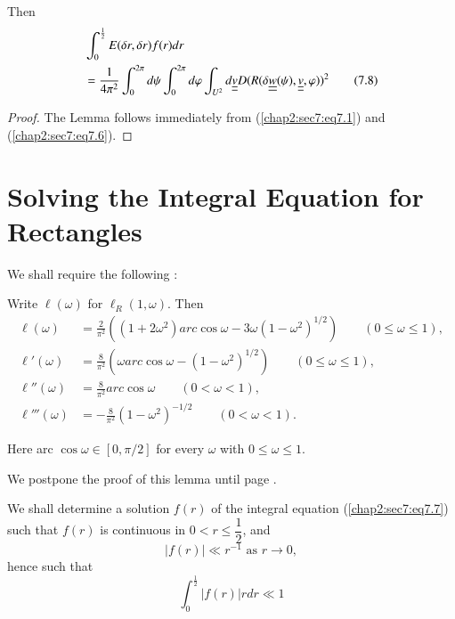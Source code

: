 Then
\begin{align*}
& \int_{0}^{\frac{1}{2}} E(\delta r, \delta r) f(r) dr\\
& = \frac{1}{4\pi^{2}} \int_{0}^{2\pi} d\psi \int_{0}^{2\pi} d\varphi \int_{U^{2}} d\underline{\underline{v}} D(R(\delta \underline{\underline{w}}(\psi), \underline{\underline{v}}, \varphi))^{2}\tag{7.8}\label{chap2:sec7:eq7.8}
\end{align*}

\begin{proof}
The Lemma follows immediately from (\ref{chap2:sec7:eq7.1}) and (\ref{chap2:sec7:eq7.6}).
\end{proof}

\section{Solving the Integral Equation for Rectangles}\label{chap2:sec8}

We shall require the following :
\begin{lemma}\label{chap2:sec8:lem8A}
Write $\ell(\omega)$ for $\ell_{R} (1, \omega)$. Then
\begin{align*}
\ell (\omega) & = \frac{2}{\pi^{2}} ((1+2\omega^{2}) arc \cos \omega - 3\omega(1 - \omega^{2})^{1/2}) \qquad (0 \leq \omega \leq 1),\\
\ell' (\omega) & = \frac{8}{\pi^{2}} (\omega arc \cos \omega - (1 - \omega^{2})^{1/2}) \qquad (0 \leq \omega \leq 1),\\
\ell'' (\omega) & = \frac{8}{\pi^{2}} arc \cos \omega \qquad(0 < \omega < 1),\\
\ell''' (\omega) & = -\frac{8}{\pi^{2}} (1 - \omega^{2})^{-1/2} \qquad (0 < \omega < 1).
\end{align*}\pageoriginale
\end{lemma}

Here arc $\cos \omega \in [0, \pi/2]$ for every $\omega$ with $0 \leq \omega \leq 1$.

 We postpone the proof of this lemma until page \pageref{105}.

 We shall determine a solution $f(r)$ of the integral equation (\ref{chap2:sec7:eq7.7}) such that $f(r)$ is continuous in $0 < r \leq \dfrac{1}{2}$, and
\begin{equation*}
|f(r)| \ll r^{-1} \text{ as } r \to 0,\tag{8.1}\label{chap2:sec8:eq8.1}
\end{equation*}
hence such that
\begin{equation*}
\int_{0}^{\frac{1}{2}} |f(r)| r dr \ll 1\tag{8.2}\label{chap2:sec8:eq8.2}
\end{equation*}


